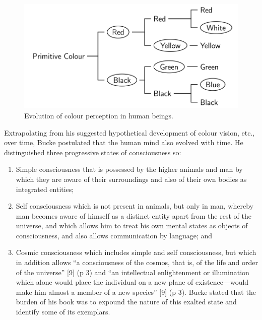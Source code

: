 \documentclass[
  12pt,
  british,
  a4paper,
]{article}
\begin{document}
\begin{figure}
\hypertarget{fig:colour-tree}{%
\centering
\includegraphics[width=1\textwidth,height=\textheight]{images/colour-perception-tree.svg}
\caption[Evolution of colour perception in human beings.]{Evolution of
colour perception in human
beings.\footnotemark{}}\label{fig:colour-tree}
}
\end{figure}

Extrapolating from his suggested hypothetical development of colour
vision, etc., over time, Bucke postulated that the human mind also
evolved with time. He distinguished three progressive states of
consciousness so:

\begin{enumerate}
\item
  Simple consciousness that is possessed by the higher animals and man
  by which they are aware of their surroundings and also of their own
  bodies as integrated entities;
\item
  Self consciousness which is not present in animals, but only in man,
  whereby man becomes aware of himself as a distinct entity apart from
  the rest of the universe, and which allows him to treat his own mental
  states as objects of consciousness, and also allows communication by
  language; and
\item
  Cosmic consciousness which includes simple and self consciousness, but
  which in addition allows ``a consciousness of the cosmos, that is, of
  the life and order of the universe'' {[}9{]} (p 3) and ``an
  intellectual enlightenment or illumination which alone would place the
  individual on a new plane of existence---would make him almost a
  member of a new species'' {[}9{]} (p 3). Bucke stated that the burden
  of his book was to expound the nature of this exalted state and
  identify some of its exemplars.
\end{enumerate}
\end{document}
